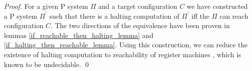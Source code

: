 \documentclass[llncs,submission,copyright,creativecommons]{../lib/lncs/llncs}
\begin{document}
\existenceofhaltingtheorem*

\begin{proof}
  For a given P system $\Pi$ and a target configuration $C$ we have constructed a P system $\Pi^\prime$ such that there is a halting computation of $\Pi^\prime$ iff the $\Pi$ can reach configuration $C$. The two directions of the equivalence have been proven in lemmas \ref{if_reachable_then_halting_lemma} and \ref{if_halting_then_reachable_lemma}. Using this construction, we can reduce the existence of halting computation to reachability of register machines \cite{Ibarra05Active}, which is known to be undecidable. \qed
\end{proof}

\end{document}
